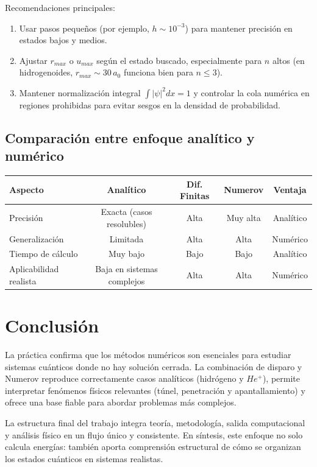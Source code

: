 \documentclass[11pt]{article}
\begin{document}
Recomendaciones principales:
\begin{enumerate}
    \item Usar pasos pequeños (por ejemplo, $h \sim 10^{-3}$) para mantener precisión en estados bajos y medios.
    \item Ajustar $r_{max}$ o $u_{max}$ según el estado buscado, especialmente para $n$ altos (en hidrogenoides, $r_{max}\sim 30\,a_0$ funciona bien para $n\leq 3$).
    \item Mantener normalización integral $\int |\psi|^2dx = 1$ y controlar la cola numérica en regiones prohibidas para evitar sesgos en la densidad de probabilidad.
\end{enumerate}

\subsection{Comparación entre enfoque analítico y numérico}\label{analitico-vs-numerico}

\begin{table}[H]
    \centering
    \begin{tabular}{|l|c|c|c|c|}
        \hline
        \textbf{Aspecto} & \textbf{Analítico} & \textbf{Dif. Finitas} & \textbf{Numerov} & \textbf{Ventaja} \\
        \hline
        Precisión & Exacta (casos resolubles) & Alta & Muy alta & Analítico \\
        Generalización & Limitada & Alta & Alta & Numérico \\
        Tiempo de cálculo & Muy bajo & Bajo & Bajo & Analítico \\
        Aplicabilidad realista & Baja en sistemas complejos & Alta & Alta & Numérico \\
        \hline
    \end{tabular}
\end{table}

\section{Conclusión}\label{conclusion-integrada}
La práctica confirma que los métodos numéricos son esenciales para estudiar sistemas cuánticos donde no hay solución cerrada. La combinación de disparo y Numerov reproduce correctamente casos analíticos (hidrógeno y $He^+$), permite interpretar fenómenos físicos relevantes (túnel, penetración y apantallamiento) y ofrece una base fiable para abordar problemas más complejos.

La estructura final del trabajo integra teoría, metodología, salida computacional y análisis físico en un flujo único y consistente. En síntesis, este enfoque no solo calcula energías: también aporta comprensión estructural de cómo se organizan los estados cuánticos en sistemas realistas.
\end{document}

